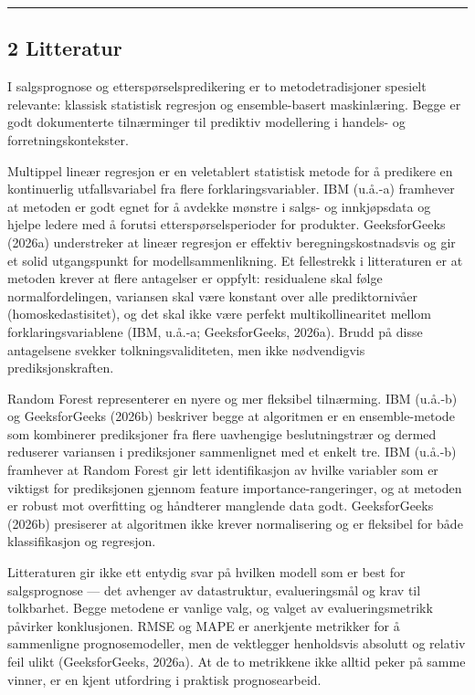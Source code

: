 \documentclass[
  11pt,
]{article}
\begin{document}
\begin{center}\rule{0.5\linewidth}{0.5pt}\end{center}

\hypertarget{litteratur}{%
\subsection{2 Litteratur}\label{litteratur}}

I salgsprognose og etterspørselspredikering er to metodetradisjoner spesielt relevante: klassisk statistisk regresjon og
ensemble-basert maskinlæring. Begge er godt dokumenterte tilnærminger til prediktiv modellering i handels- og
forretningskontekster.

Multippel lineær regresjon er en veletablert statistisk metode for å predikere en kontinuerlig utfallsvariabel fra flere
forklaringsvariabler. IBM (u.å.-a) framhever at metoden er godt egnet for å avdekke mønstre i salgs- og innkjøpsdata og
hjelpe ledere med å forutsi etterspørselsperioder for produkter. GeeksforGeeks (2026a) understreker at lineær regresjon
er effektiv beregningskostnadsvis og gir et solid utgangspunkt for modellsammenlikning. Et fellestrekk i litteraturen er
at metoden krever at flere antagelser er oppfylt: residualene skal følge normalfordelingen, variansen skal være konstant
over alle prediktornivåer (homoskedastisitet), og det skal ikke være perfekt multikollinearitet mellom
forklaringsvariablene (IBM, u.å.-a; GeeksforGeeks, 2026a). Brudd på disse antagelsene svekker tolkningsvaliditeten, men
ikke nødvendigvis prediksjonskraften.

Random Forest representerer en nyere og mer fleksibel tilnærming. IBM (u.å.-b) og GeeksforGeeks (2026b) beskriver begge
at algoritmen er en ensemble-metode som kombinerer prediksjoner fra flere uavhengige beslutningstrær og dermed reduserer
variansen i prediksjoner sammenlignet med et enkelt tre. IBM (u.å.-b) framhever at Random Forest gir lett identifikasjon
av hvilke variabler som er viktigst for prediksjonen gjennom feature importance-rangeringer, og at metoden er robust mot
overfitting og håndterer manglende data godt. GeeksforGeeks (2026b) presiserer at algoritmen ikke krever normalisering
og er fleksibel for både klassifikasjon og regresjon.

Litteraturen gir ikke ett entydig svar på hvilken modell som er best for salgsprognose --- det avhenger av datastruktur,
evalueringsmål og krav til tolkbarhet. Begge metodene er vanlige valg, og valget av evalueringsmetrikk påvirker
konklusjonen. RMSE og MAPE er anerkjente metrikker for å sammenligne prognosemodeller, men de vektlegger henholdsvis
absolutt og relativ feil ulikt (GeeksforGeeks, 2026a). At de to metrikkene ikke alltid peker på samme vinner, er en
kjent utfordring i praktisk prognosearbeid.
\end{document}
